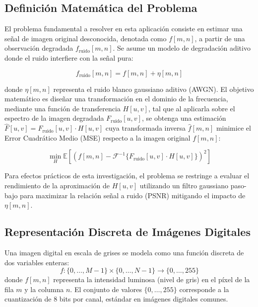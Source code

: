 \documentclass[conference]{IEEEtran}
\begin{document}
\subsection{Definición Matemática del Problema}
El problema fundamental a resolver en esta aplicación consiste en estimar una señal de imagen original desconocida, denotada como $f[m,n]$, a partir de una observación degradada $f_{\text{ruido}}[m,n]$. Se asume un modelo de degradación aditivo donde el ruido interfiere con la señal pura:

\begin{equation}
  f_{\text{ruido}}[m,n] = f[m,n] + \eta[m,n]
\end{equation}

donde $\eta[m,n]$ representa el ruido blanco gaussiano aditivo (AWGN). El objetivo matemático es diseñar una transformación en el dominio de la frecuencia, mediante una función de transferencia $H[u,v]$, tal que al aplicarla sobre el espectro de la imagen degradada $F_{\text{ruido}}[u,v]$, se obtenga una estimación $\hat{F}[u,v] = F_{\text{ruido}}[u,v] \cdot H[u,v]$ cuya transformada inversa $\hat{f}[m,n]$ minimice el Error Cuadrático Medio (MSE) respecto a la imagen original $f[m,n]$:

\begin{equation}
  \min_{H} \mathbb{E}\left[ \left( f[m,n] - \mathcal{F}^{-1}\{F_{\text{ruido}}[u,v] \cdot H[u,v]\} \right)^2 \right]
\end{equation}

Para efectos prácticos de esta investigación, el problema se restringe a evaluar el rendimiento de la aproximación de $H[u,v]$ utilizando un filtro gaussiano paso-bajo para maximizar la relación señal a ruido (PSNR) mitigando el impacto de $\eta[m,n]$.

\subsection{Representación Discreta de Imágenes Digitales}

Una imagen digital en escala de grises se modela como una función discreta
de dos variables enteras:
\begin{equation}
  f:\{0,\ldots,M{-}1\}\times\{0,\ldots,N{-}1\}\longrightarrow\{0,\ldots,255\}
  \label{eq:img_gray}
\end{equation}
donde $f[m,n]$ representa la intensidad luminosa (nivel de gris) en el
píxel de la fila $m$ y la columna $n$. El conjunto de valores $\{0,\ldots,255\}$
corresponde a la cuantización de 8 bits por canal, estándar en imágenes
digitales comunes.
\end{document}
